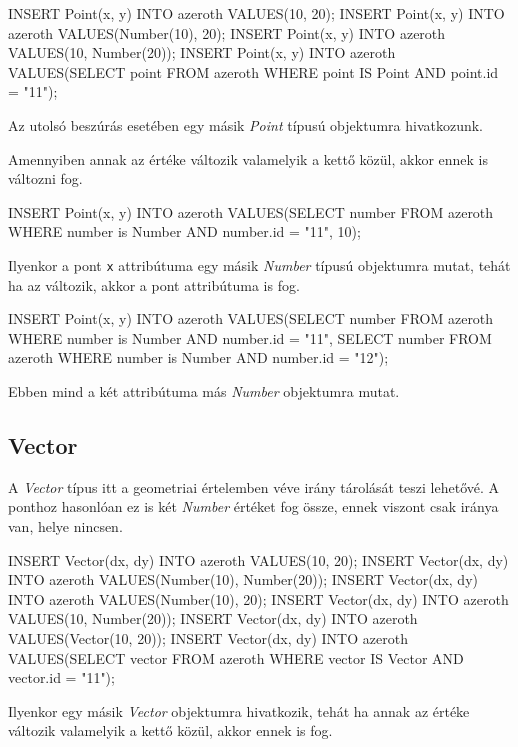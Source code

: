 \begin{sql}
INSERT Point(x, y) INTO azeroth VALUES(10, 20);
INSERT Point(x, y) INTO azeroth VALUES(Number(10), 20);
INSERT Point(x, y) INTO azeroth VALUES(10, Number(20));
INSERT Point(x, y) INTO azeroth VALUES(SELECT point FROM azeroth
    WHERE point IS Point AND point.id = "11");
\end{sql}

Az utolsó beszúrás esetében egy másik \textit{Point} típusú objektumra hivatkozunk.

\noindent Amennyiben annak az értéke változik valamelyik a kettő közül, akkor ennek is változni fog.

\begin{sql}
INSERT Point(x, y) INTO azeroth VALUES(SELECT number FROM azeroth
    WHERE number is Number AND number.id = "11", 10);
\end{sql}

Ilyenkor a pont \texttt{x} attribútuma egy másik \textit{Number} típusú objektumra mutat, tehát ha az változik, akkor a pont attribútuma is fog.

\begin{sql}
INSERT Point(x, y) INTO azeroth VALUES(SELECT number FROM azeroth
    WHERE number is Number AND number.id = "11",
    SELECT number FROM azeroth
    WHERE number is Number AND number.id = "12");
\end{sql}

Ebben mind a két attribútuma más \textit{Number} objektumra mutat.

\subsection{Vector}

A \textit{Vector} típus itt a geometriai értelemben véve irány tárolását teszi lehetővé. A ponthoz hasonlóan ez is két \textit{Number} értéket fog össze, ennek viszont csak iránya van, helye nincsen.

\begin{sql}
INSERT Vector(dx, dy) INTO azeroth VALUES(10, 20);
INSERT Vector(dx, dy) INTO azeroth VALUES(Number(10), Number(20));
INSERT Vector(dx, dy) INTO azeroth VALUES(Number(10), 20);
INSERT Vector(dx, dy) INTO azeroth VALUES(10, Number(20));
INSERT Vector(dx, dy) INTO azeroth VALUES(Vector(10, 20));
INSERT Vector(dx, dy) INTO azeroth VALUES(SELECT vector FROM
azeroth WHERE vector IS Vector AND vector.id = "11");
\end{sql}

Ilyenkor egy másik \textit{Vector} objektumra hivatkozik, tehát ha annak az értéke változik valamelyik a kettő közül, akkor ennek is fog.

